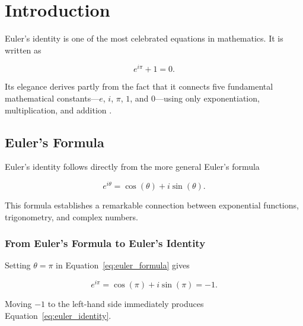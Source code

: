 \documentclass[a4paper,11pt]{article}
\begin{document}

\section{Introduction}

Euler's identity is one of the most celebrated equations in
mathematics. It is written as

\begin{equation}
    e^{i\pi} + 1 = 0.
    \label{eq:euler_identity}
\end{equation}

Its elegance derives partly from the fact that it connects five
fundamental mathematical constants---$e$, $i$, $\pi$, $1$, and
$0$---using only exponentiation, multiplication, and addition
\cite{euler1748introductio}.

\subsection{Euler's Formula}

Euler's identity follows directly from the more general Euler's
formula

\begin{equation}
    e^{i\theta}
    =
    \cos(\theta) + i\sin(\theta).
    \label{eq:euler_formula}
\end{equation}

This formula establishes a remarkable connection between exponential
functions, trigonometry, and complex numbers.

\subsubsection{From Euler's Formula to Euler's Identity}

Setting $\theta=\pi$ in Equation~\ref{eq:euler_formula} gives

\begin{equation}
    e^{i\pi}
    =
    \cos(\pi) + i\sin(\pi)
    =
    -1.
\end{equation}

Moving $-1$ to the left-hand side immediately produces
Equation~\ref{eq:euler_identity}.
\end{document}
